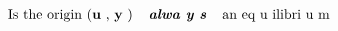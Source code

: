 \documentclass[preview]{standalone}
\begin{document}
\begin{align*}
\text { Is   the   origin   (\textbf u ,   \textbf y )   \textbf { \emph { alwa y s } }   an   eq u ilibri u m }
\end{align*}
\end{document}
